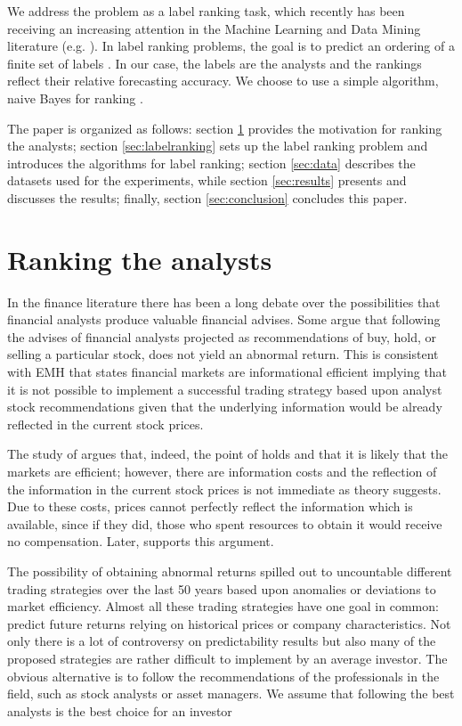 We address the problem as a label ranking task, which recently has been receiving an increasing attention in the Machine Learning and Data Mining literature (e.g. \citep{hullermeier,cheng2009}). In label ranking problems,  the goal is to predict an ordering of a finite set of labels \citep{vembu2009}. In our case, the labels are the analysts and the rankings reflect their relative forecasting accuracy.  We choose to use a simple algorithm, naive Bayes for ranking \citep{aiguzhinov2010}. 

The paper is organized as follows: section \ref{sec:ranking} provides the motivation for ranking the analysts; section \ref{sec:labelranking} sets up the label ranking problem and introduces the algorithms for label ranking; section \ref{sec:data} describes the datasets used for the experiments, while section \ref{sec:results} presents and discusses the results; finally, section \ref{sec:conclusion} concludes this paper.


\section{Ranking the analysts}
\label{sec:ranking}

In the finance literature there has been a long debate over the possibilities that financial analysts produce valuable financial advises. Some argue that following the advises of financial analysts projected as recommendations of buy, hold, or selling a particular stock, does not yield an abnormal return. This is consistent with EMH that states financial markets are informational efficient implying that it is not possible to implement a successful trading strategy based upon analyst stock recommendations given that the underlying information would be already reflected in the current stock prices.

The study of \cite{grossman1980iie} argues that, indeed, the point of \cite{fama1970ecm} holds and that it is likely that the markets are efficient; however, there are  information costs and the reflection of the information in the current stock prices is  not immediate as theory suggests. Due to these costs, prices cannot perfectly reflect the information which is available, since if they did, those who spent resources to obtain it would receive no compensation. Later, \cite{fama1991ecm} supports this argument.

The possibility of obtaining abnormal returns spilled out to uncountable different trading strategies over the last 50 years based upon anomalies or deviations to market efficiency. Almost all these trading strategies have one goal in common: predict future returns relying on historical prices or company characteristics. Not only there is a lot of controversy on predictability results but also many of the proposed strategies are rather difficult to implement by an average investor. The obvious alternative is to follow the recommendations of the professionals in the field, such as stock analysts or asset managers. We assume that following the best analysts is the best choice for an investor

